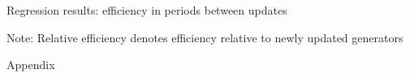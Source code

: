 \documentclass{beamer}
\begin{document}

\begin{frame}{Regression results: efficiency in periods between updates}\label{effic_between_1gen}
\scriptsize
\begin{table}
\centering
\caption{Relative efficiency in periods between updates regressed on covariates}

\end{table}
\scriptsize{Note: Relative efficiency denotes efficiency relative to newly updated generators}

\hyperlink{effic_between_all}{}

\end{frame}

\appendix
\begin{frame}{Appendix}

\end{frame}
\end{document}
